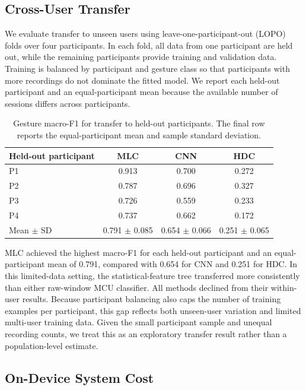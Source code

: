 \subsection{Cross-User Transfer}

We evaluate transfer to unseen users using leave-one-participant-out (LOPO)
folds over four participants. In each fold, all data from one
participant are held out, while the remaining participants provide training
and validation data. Training is balanced by participant and gesture class so
that participants with more recordings do not dominate the fitted model. We
report each held-out participant and an equal-participant mean because the
available number of sessions differs across participants.

\begin{table}[t]
    \centering
    \caption{Gesture macro-F1 for transfer to held-out participants. The final
    row reports the equal-participant mean and sample standard deviation.}
    \label{tab:cross_user}
    \small
    \begin{tabular}{lccc}
        \toprule
        Held-out participant & MLC & CNN & HDC \\
        \midrule
        P1 & 0.913 & 0.700 & 0.272 \\
        P2 & 0.787 & 0.696 & 0.327 \\
        P3 & 0.726 & 0.559 & 0.233 \\
        P4 & 0.737 & 0.662 & 0.172 \\
        \midrule
        Mean $\pm$ SD
            & 0.791 $\pm$ 0.085
            & 0.654 $\pm$ 0.066
            & 0.251 $\pm$ 0.065 \\
        \bottomrule
    \end{tabular}
\end{table}

MLC achieved the highest macro-F1 for each held-out participant and an
equal-participant mean of 0.791, compared with 0.654 for CNN and 0.251 for HDC.
In this limited-data setting, the statistical-feature tree transferred more
consistently than either raw-window MCU classifier. All methods declined from
their within-user results. Because participant balancing also caps the number
of training examples per participant, this gap reflects both unseen-user
variation and limited multi-user training data.
Given the small participant sample and unequal recording counts, we treat this
as an exploratory transfer result rather than a population-level estimate.

\subsection{On-Device System Cost}

